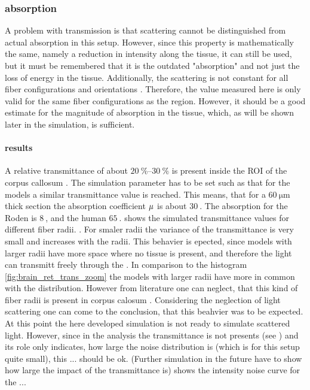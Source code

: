 \subsubsection{absorption}
% 
A problem with transmission is that scattering cannot be distinguished from actual absorption in this setup.
However, since this property is mathematically the same, namely a reduction in intensity along the tissue, it can still be used, but it must be remembered that it is the outdated "absorption" and not just the loss of energy in the tissue.
Additionally, the scattering is not constant for all fiber configurations and orientations \dummy[see MM]{}.
Therefore, the value measured here is only valid for the same fiber configurations as the region.
However, it should be a good estimate for the magnitude of absorption in the tissue, which, as will be shown later in the simulation, is sufficient.
% 
\paragraph{results}
A relative transmittance of about $\SIrange{20}{30}{\percent}$ is present inside the \ac{ROI} of the corpus callosum . 
The simulation parameter has to be set such as that for the models a similar transmittance value is reached.
This means, that for a $\SI{60}{\micro\meter}$ thick section the absorption coefficient $\textnormal{$\mu$}{}$ is about $\SI{30}{}$. 
The absorption for the Roden is $\SI{8}{}$, and the human $\SI{65}{}$.
%
 shows the simulated transmittance values for different fiber radii. .
For smaler radii the variance of the transmittance is very small \dummy{} and increases with the radii.
This behavier is epected, since models with larger radii have more space where no tissue is present, and therefore the light can transmitt freely through the .
In comparison to the histogram \cref{fig:brain_ret_trans_zoom} the models with larger radii have more in common with the distribution.
However from literature one can neglect, that this kind of fiber radii is present in corpus calosum \dummy{}. 
Considering the neglection of light scattering one can come to the conclusion, that this beahvier was to be expected.
At this point the here developed simulation is not ready to simulate scattered light.
However, since in the analysis the transmittance is not presents (see \dummy{}) and its role only indicates, how large the noise distribution is (which is for this setup quite small), this ... should be ok.
(Further simulation in the future have to show how large the impact of the transmittance is)
%  
 shows the intensity noise curve for the ...
% 
% 
%
